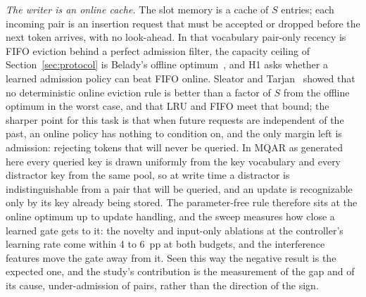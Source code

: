 \documentclass[conference]{IEEEtran}
\begin{document}
\textit{The writer is an online cache.} The slot memory is a cache of $S$
entries; each incoming pair is an insertion request that must be accepted or
dropped before the next token arrives, with no look-ahead. In that vocabulary
pair-only recency is FIFO eviction behind a perfect admission filter, the
capacity ceiling of Section~\ref{sec:protocol} is Belady's offline
optimum~\cite{belady1966study}, and H1 asks whether a learned admission policy
can beat FIFO online. Sleator and Tarjan~\cite{sleator1985amortized} showed
that no deterministic online eviction rule is better than a factor of $S$
from the offline optimum in the worst case, and that LRU and FIFO meet that
bound; the sharper point for this task is that when future requests are
independent of the past, an online policy has nothing to condition on, and
the only margin left is admission: rejecting tokens that will never be
queried. In MQAR as generated here every queried key is drawn uniformly from
the key vocabulary and every distractor key from the same pool, so at write
time a distractor is indistinguishable from a pair that will be queried, and
an update is recognizable only by its key already being stored. The
parameter-free rule therefore sits at the online optimum up to update
handling, and the sweep measures how close a learned gate gets to it: the
novelty and input-only ablations at the controller's learning rate come within
4 to 6~pp at both budgets, and the interference features move the gate away
from it. Seen
this way the negative result is the expected one, and the study's
contribution is the measurement of the gap and of its cause, under-admission
of pairs, rather than the direction of the sign.
\end{document}
